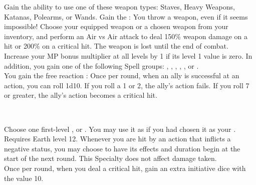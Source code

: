 \begin{tabjob}
    \tabjobspec{}

         Gain the ability to use one of these weapon types: Staves, Heavy Weapons, Katanas, Polearms, or Wands. Gain the  : You throw a weapon, even if it seems impossible! Choose your equipped weapon or  a chosen weapon from your inventory, and perform an Air vs Air attack to deal 150\% weapon damage on a hit or 200\% on a critical hit. The weapon is lost until the end of combat. \\

         Increase your MP bonus multiplier at all levels by 1 if its level 1 value is zero. In addition, you gain one of the following Spell groups: , , , , , or . \\
        
         You gain the free reaction : Once per round, when an ally is successful at an action, you can roll 1d10. If you roll a 1 or 2, the ally's action fails. If you roll 7 or greater, the ally's action becomes a critical hit. \\

    \tabjobsep%

     \\
    \tabjobspec{}

         Choose one first-level ,  or . You may use it as if you had chosen it as your . \\

         Requires Earth level 12. Whenever you are hit by an action that inflicts a negative status, you may choose to have its effects and duration begin at the start of the next round. This Specialty does not affect damage taken. \\

         Once per round, when you deal a critical hit, gain an extra initiative dice with the value 10. \\

    \tabjobsep%

     \\
    \tabjobspec{}
    

\end{tabjob}
